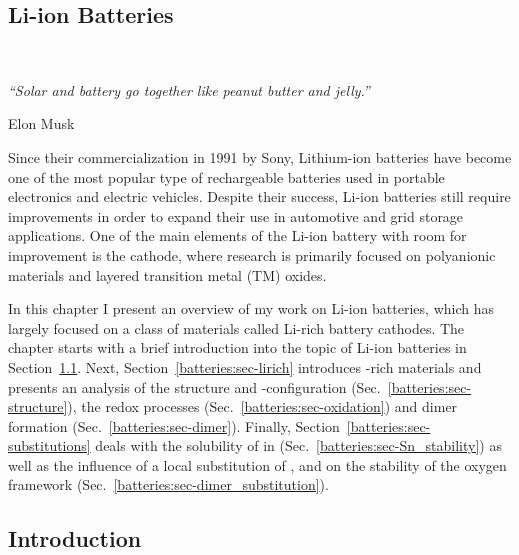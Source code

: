 \begin{refsection}

\chapter{Li-ion Batteries}~\label{chapter:batteries}

\setlength{\epigraphwidth}{3in}
\epigraph{\textit{``Solar and battery go together like peanut butter and jelly.” }}{Elon Musk}
\vspace{3em}

Since their commercialization in 1991 by Sony, Lithium-ion batteries have become one of the most popular type of rechargeable batteries used in portable electronics and electric vehicles. Despite their success, Li-ion batteries still require improvements in order to expand their use in automotive and grid storage applications. One of the main elements of the Li-ion battery with room for improvement is the cathode, where research is primarily focused on polyanionic materials and layered transition metal (TM) oxides. 

In this chapter I present an overview of my work on Li-ion batteries, which has largely focused on a class of materials called Li-rich battery cathodes. The chapter starts with a brief introduction into the topic of Li-ion batteries in Section~\ref{batteries:sec-intro}. Next, Section~\ref{batteries:sec-lirich} introduces -rich materials and presents an analysis of the structure and -configuration (Sec.~\ref{batteries:sec-structure}), the redox processes (Sec.~\ref{batteries:sec-oxidation}) and dimer formation (Sec.~\ref{batteries:sec-dimer}). Finally, Section~\ref{batteries:sec-substitutions} deals with the solubility of  in  (Sec.~\ref{batteries:sec-Sn_stability}) as well as the influence of a local substitution of ,  and  on the stability of the oxygen framework (Sec.~\ref{batteries:sec-dimer_substitution}).

\clearpage

\section{Introduction} \label{batteries:sec-intro}


\end{refsection}
